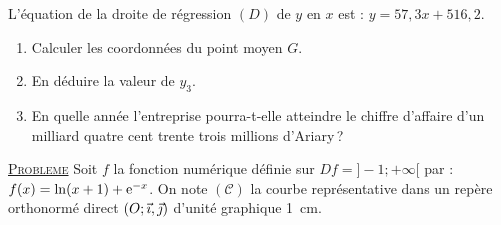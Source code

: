 \begin{description}
                  L'\'equation de la droite de r\'egression $(D)$ de $y$ en $x$ est : $y = 57,3 x + 516,2$.
                  \begin{enumerate}
                        \item Calculer les coordonn\'ees du point moyen $G$.
                        \item En d\'eduire la valeur de $y_3$.
                        \item En quelle ann\'ee l'entreprise pourra-t-elle atteindre le chiffre d'affaire 
                              d'un milliard quatre cent trente trois millions d'Ariary\,?
                  \end{enumerate}
      \end{description}
\noindent \underline{\textsc{Probleme}} \newline
      Soit $f$ la fonction num\'erique d\'efinie sur $Df = ]-1 ; +\infty[$ par : $f(x) = \ln (x+1) + \mathrm{e}^{-x}$.
      On note $(\mathscr{C})$ la courbe repr\'esentative dans un rep\`ere orthonorm\'e direct $(O;\vec{\imath}, \vec{\jmath})$
      d'unit\'e graphique 1~cm.
